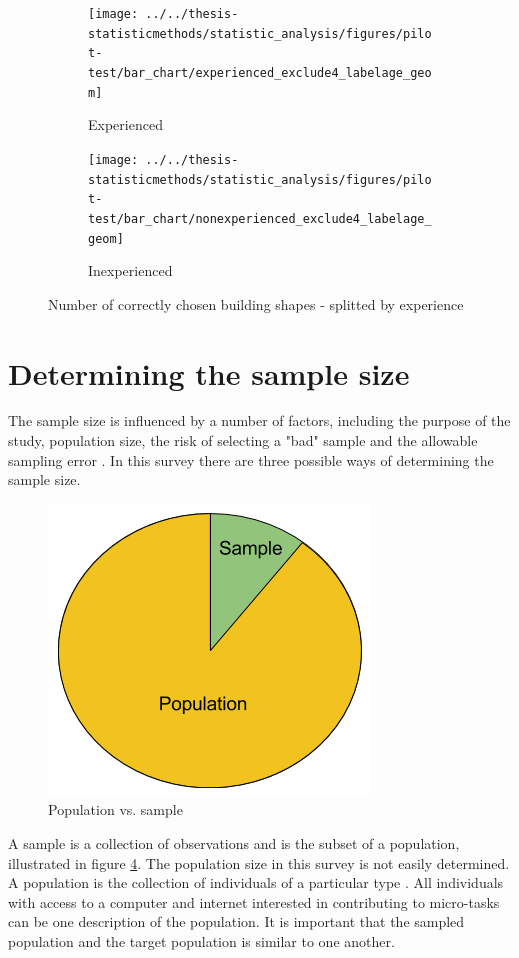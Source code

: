 \begin{figure}[H]
	\centering
	\begin{subfigure}[b]{0.45\textwidth}
		\centering
		\texttt{[image: ../../thesis-statisticmethods/statistic\_analysis/figures/pilot-test/bar\_chart/experienced\_exclude4\_labelage\_geom]}
		\caption{Experienced}
		\label{fig:experiencedexclude4labelagegeom}
	\end{subfigure}
	\begin{subfigure}[b]{0.45\textwidth}
		\centering
		\texttt{[image: ../../thesis-statisticmethods/statistic\_analysis/figures/pilot-test/bar\_chart/nonexperienced\_exclude4\_labelage\_geom]}
		\caption{Inexperienced}
		\label{fig:nonexperiencedexclude4labelagegeom}
	\end{subfigure}	
\caption[Correcly chosen shapes, sorted]{Number of correctly chosen building shapes - splitted by experience}
\end{figure}

\section[Sample Size]{Determining the sample size}
The sample size is influenced by a number of factors, including the purpose of the study, population size, the risk of selecting a "bad" sample and the allowable sampling error \citep{Israel1992}. In this survey there are three possible ways of determining the sample size. 

\begin{figure}[h]
	\centering
	\includegraphics[width=0.35\linewidth]{fig/popsample}
	\caption{Population vs. sample}
	\label{fig:popsample}
\end{figure}

A sample is a collection of observations and is the subset of a population, illustrated in figure \ref{fig:popsample}. The population size in this survey is not easily determined. A population is the collection of individuals of a particular type \citep{Walpole2012}. All individuals with access to a computer and internet interested in contributing to micro-tasks can be one description of the population. It is important that the sampled population and the target population is similar to one another.

